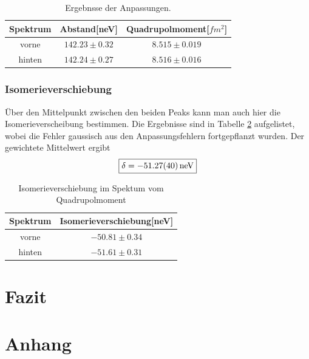 \documentclass[12pt,a4paper]{article}
\begin{document}
\begin{table}
\centering
\begin{tabular}{|c|c|c|}
\hline
Spektrum & Abstand[neV] & Quadrupolmoment[$\si{fm^2}$]\\
\hline
vorne & $ 142.23 \pm 0.32 $ & $ 8.515 \pm 0.019 $\\
\hline
\hline
hinten & $ 142.24 \pm 0.27 $ & $ 8.516 \pm 0.016 $\\
\hline
\end{tabular}
\caption{Ergebnsse der Anpassungen.}
\label{tab:Quad_ergebnis}
\end{table}

\subsubsection{Isomerieverschiebung}
Über den Mittelpunkt zwischen den beiden Peaks kann man auch hier die Isomerieverscheibung bestimmen. Die Ergebnisse sind in Tabelle \ref{tab:Quad_Iso} aufgelistet, wobei die Fehler gaussisch aus den Anpassungsfehlern fortgepflanzt wurden. Der gewichtete Mittelwert ergibt
\begin{equation*}
\boxed{\delta = \SI{-51.27\pm 0.40}{neV}}
\end{equation*}

\begin{table}
\centering
\begin{tabular}{|c|c|}
\hline
Spektrum & Isomerieverschiebung[neV]\\
\hline
vorne & $ -50.81\pm 0.34 $\\
\hline
\hline
hinten & $ -51.61 \pm 0.31 $\\
\hline
\end{tabular}
\caption{Isomerieverschiebung im Spektum vom Quadrupolmoment}
\label{tab:Quad_Iso}
\end{table}

\section{Fazit}


\newpage
\section{Anhang}
\end{document}
